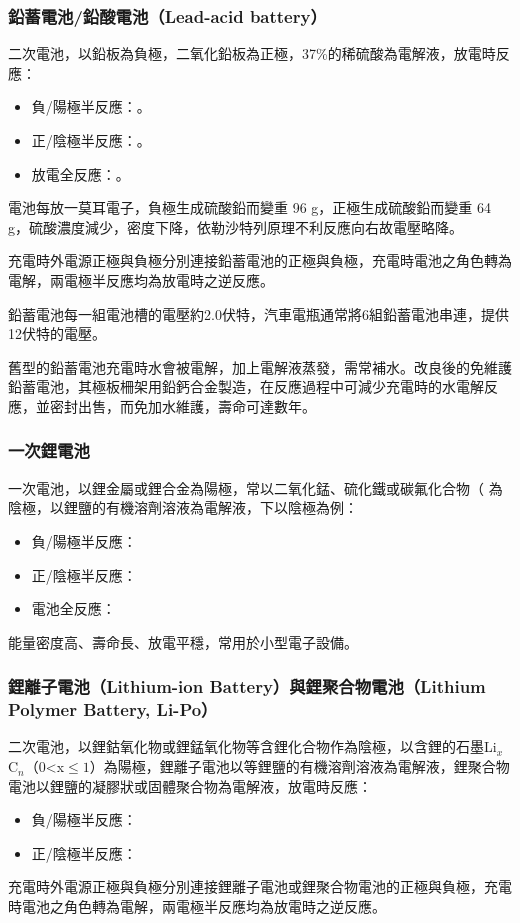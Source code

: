 \documentclass[a4paper,12pt]{report}
\begin{document}
\begin{itemize}
\begin{itemize}
\subsubsection{鉛蓄電池/鉛酸電池（Lead-acid battery）}
二次電池，以鉛板為負極，二氧化鉛板為正極，37\%的稀硫酸為電解液，放電時反應：
\begin{itemize}
\item 負/陽極半反應：。
\item 正/陰極半反應：。
\item 放電全反應：。
\end{itemize}
電池每放一莫耳電子，負極生成硫酸鉛而變重 96 g，正極生成硫酸鉛而變重 64 g，硫酸濃度減少，密度下降，依勒沙特列原理不利反應向右故電壓略降。

充電時外電源正極與負極分別連接鉛蓄電池的正極與負極，充電時電池之角色轉為電解，兩電極半反應均為放電時之逆反應。

鉛蓄電池每一組電池槽的電壓約2.0伏特，汽車電瓶通常將6組鉛蓄電池串連，提供12伏特的電壓。

舊型的鉛蓄電池充電時水會被電解，加上電解液蒸發，需常補水。改良後的免維護鉛蓄電池，其極板柵架用鉛鈣合金製造，在反應過程中可減少充電時的水電解反應，並密封出售，而免加水維護，壽命可達數年。
\subsubsection{一次鋰電池}
一次電池，以鋰金屬或鋰合金為陽極，常以二氧化錳、硫化鐵或碳氟化合物（
為陰極，以鋰鹽的有機溶劑溶液為電解液，下以陰極為例：
\begin{itemize}
\item 負/陽極半反應：
\item 正/陰極半反應：
\item 電池全反應：
\end{itemize}
能量密度高、壽命長、放電平穩，常用於小型電子設備。
\subsubsection{鋰離子電池（Lithium-ion Battery）與鋰聚合物電池（Lithium Polymer Battery, Li-Po）}
二次電池，以鋰鈷氧化物或鋰錳氧化物等含鋰化合物作為陰極，以含鋰的石墨Li$_x$C$_n$（0<x$\leq 1$）為陽極，鋰離子電池以等鋰鹽的有機溶劑溶液為電解液，鋰聚合物電池以鋰鹽的凝膠狀或固體聚合物為電解液，放電時反應：
\begin{itemize}
\item 負/陽極半反應：
\item 正/陰極半反應：
\end{itemize}
充電時外電源正極與負極分別連接鋰離子電池或鋰聚合物電池的正極與負極，充電時電池之角色轉為電解，兩電極半反應均為放電時之逆反應。


\end{itemize}
\end{itemize}
\end{document}
